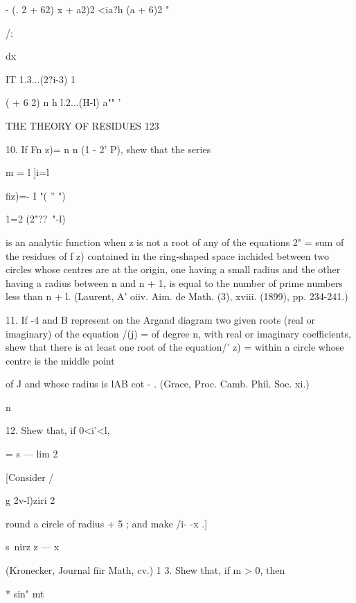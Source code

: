 -   (. 2 + 62)  x  + a2)2 <ia?h (a + 6)2 " 



/: 



dx 



IT 1.3...(2?i-3) 1 



(  + 6 2)   n h l.2...(H-l) a"" ' 



THE THEORY OF RESIDUES 123 



10. If Fn  z)= n n (1 - 2' P), shew that the series 

m = l ]i=l 

fiz)=- I  "( '' ") 



1=2 (2"??~"-l)%

is an analytic function when z is not a root of any of the equations 2" = %
sum of the residues of f z) contained in the ring-shaped space inchided between two 
circles whose centres are at the origin, one having a small radius and the other having 
a radius between n and n + 1, is equal to the number of prime numbers less than n + l. 
(Laurent, A' oiiv. Aim. de Math. (3), xviii. (1899), pp. 234-241.) 

11. If -4 and B represent on the Argand diagram two given roots (real or imaginary) 
of the equation /(j) = of degree n, with real or imaginary coefficients, shew that there is 
at least one root of the equation/'  z) = within a circle whose centre is the middle point 

of J  and whose radius is lAB cot - . (Grace, Proc. Camb. Phil. Soc. xi.) 

n 



12. Shew that, if 0<i'<l, 



= s —   lim 2 



[Consider / 



g 2v-l)ziri  2 

round a circle of radius   + 5 ; and make /i- -x .] 



s\ nirz z — x 

(Kronecker, Journal fiir Math, cv.) 
1 3. Shew that, if m > 0, then 

* sin" mt 



